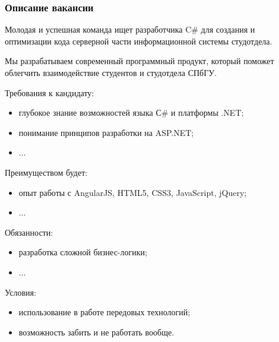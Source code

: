 \documentclass{../../slides-style}
\begin{document}
    \begin{frame}
        \frametitle{Описание вакансии}
        \begin{scriptsize}
            Молодая и успешная команда ищет разработчика C\# для создания и оптимизации кода серверной части информационной системы студотдела.

            Мы разрабатываем современный программный продукт, который поможет облегчить взаимодействие студентов и студотдела СПбГУ.

            Требования к кандидату:
            \begin{itemize}
                \item глубокое знание возможностей языка С\# и платформы .NET;
                \item понимание принципов разработки на ASP.NET;
                \item ...
            \end{itemize}

            Преимуществом будет:
            \begin{itemize}
                \item опыт работы с AngularJS, HTML5, CSS3, JavaScript, jQuery;
                \item ...
            \end{itemize}

            Обязанности:
            \begin{itemize}
                \item разработка сложной бизнес-логики;
                \item ...
            \end{itemize}

            Условия:
            \begin{itemize}
                \item использование в работе передовых технологий;
                \item возможность забить и не работать вообще.
            \end{itemize}
        \end{scriptsize}
    \end{frame}
\end{document}
